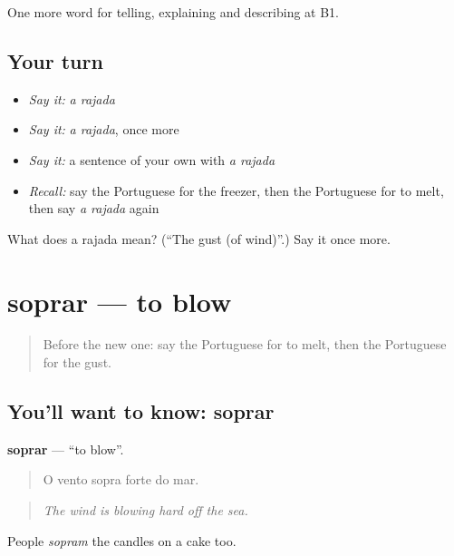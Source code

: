 \begin{grammarlens}[title={What you've built}]
One more word for telling, explaining and describing at B1.
\end{grammarlens}

\subsection*{Your turn}
\begin{itemize}
\raggedright
  \item \emph{Say it:} \emph{a rajada}
  \item \emph{Say it:} \emph{a rajada}, once more
  \item \emph{Say it:} a sentence of your own with \emph{a rajada}
  \item \emph{Recall:} say the Portuguese for the freezer, then the Portuguese for to melt, then say \emph{a rajada} again
\end{itemize}

\begin{tcolorbox}[breakable,colback=teal!4,colframe=teal!35!black,title={Before you move on}]
What does a rajada mean? (\textquotedblleft{}The gust (of wind)\textquotedblright{}.) Say it once more.
\end{tcolorbox}
\section[soprar]{soprar — to blow}

\label{lesson:PT-C465-soprar}



\begin{quote}
Before the new one: say the Portuguese for to melt, then the Portuguese for the gust.
\end{quote}

\subsection*{You'll want to know: soprar}
\textbf{soprar} — \textquotedblleft{}to blow\textquotedblright{}.

\begin{quote}
O vento sopra forte do mar.
\end{quote}

\begin{quote}
\emph{The wind is blowing hard off the sea.}
\end{quote}

People \emph{sopram} the candles on a cake too.

